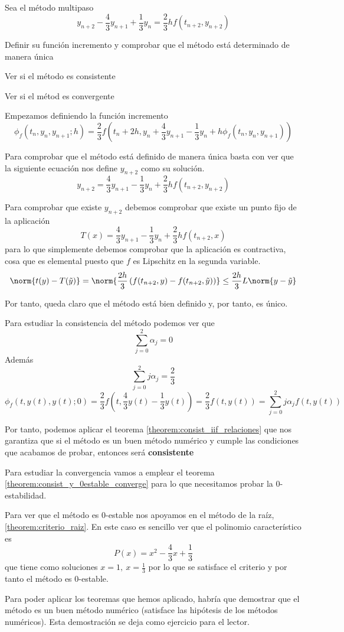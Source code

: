 \begin{problem}[5]
Sea el método multipaso
\[y_{n+2} - \frac{4}{3}y_{n+1}+\frac{1}{3}y_n = \frac{2}{3}hf(t_{n+2},y_{n+2})\]

\ppart Definir su función incremento y comprobar que el método está determinado de manera única

\ppart Ver si el método es consistente

\ppart Ver si el métod es convergente
\solution

\spart
Empezamos definiendo la función incremento
\[\phi_f(t_n,y_n,y_{n+1};h) = \frac{2}{3}f\left(t_n+2h,y_n+\frac{4}{3}y_{n+1}-\frac{1}{3}y_n+h\phi_f(t_n,y_n,y_{n+1})\right)\]


Para comprobar que el método está definido de manera única basta con ver que la siguiente ecuación nos define $y_{n+2}$ como su solución.
\[y_{n+2} = \frac{4}{3}y_{n+1}-\frac{1}{3}y_n + \frac{2}{3}hf(t_{n+2},y_{n+2})\]

Para comprobar que existe $y_{n+2}$ debemos comprobar que existe un punto fijo de la aplicación
\[T(x) =  \frac{4}{3}y_{n+1}-\frac{1}{3}y_n + \frac{2}{3}hf(t_{n+2},x)\]
para lo que simplemente debemos comprobar que la aplicación es contractiva, cosa que es elemental puesto que $f$ es Lipschitz en la segunda variable.
\[\norm{t(y)-T(\tilde{y})} = \norm{\frac{2h}{3} \left( f(t_{n+2},y) - f(t_{n+2},\tilde{y})\right)} \leq \frac{2h}{3}L\norm{y - \tilde{y}}\]

Por tanto, queda claro que el método está bien definido y, por tanto, es único.

\spart

Para estudiar la consistencia del método podemos ver que
\[\sum_{j=0}^2 α_j = 0\]
Además
\[\sum_{j=0}^2jα_j = \frac{2}{3}\]
\[\phi_f(t,y(t),y(t);0) = \frac{2}{3}f(t,\frac{4}{3}y(t)-\frac{1}{3}y(t)) = \frac{2}{3}f(t,y(t)) = \sum_{j=0}^2 jα_j f(t,y(t))\]

Por tanto, podemos aplicar el teorema \ref{theorem:consist_iif_relaciones} que nos garantiza que si el método es un buen método numérico y cumple las condiciones que acabamos de probar, entonces será \textbf{consistente}

\spart

Para estudiar la convergencia vamos a emplear el teorema \ref{theorem:consist_y_0estable_converge} para lo que necesitamos probar la 0-estabilidad.

Para ver que el método es 0-estable nos apoyamos en el método de la raíz, \ref{theorem:criterio_raiz}. En este caso es sencillo ver que el polinomio característico es
\[P(x)=x^2-\frac{4}{3}x+\frac{1}{3}\]
que tiene como soluciones $x=1, \ x=\frac{1}{3}$ por lo que se satisface el criterio y por tanto el método es 0-estable.

\obs Para poder aplicar los teoremas que hemos aplicado, habría que demostrar que el método es un buen método numérico (satisface las hipótesis de los métodos numéricos). Esta demostración se deja como ejercicio para el lector.

\end{problem}


